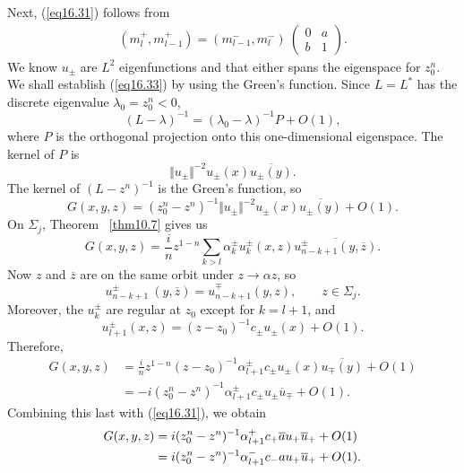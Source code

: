 \documentclass{surv-l}
\theoremstyle{plain}
\theoremstyle{definition}
\numberwithin{equation}{chapter}
\begin{document}
Next, (\ref{eq16.31}) follows from
\begin{align*}
(m_{l}^{+},m_{l-1}^{+})=(m_{l-1}^{-}, m_{l}^{-})\ \left(\begin{array}{ll}
0 & a\\
b & 1
\end{array}\right).
\end{align*}
We know $u_{\pm}$ are $L^{2}$ eigenfunctions and that either spans the eigenspace for $z_{0}^{n}$. We shall establish (\ref{eq16.33}) by using the Green's  function. Since $L=L^{*}$ has the discrete eigenvalue $\lambda_{0}=z_{0}^{n}<0$,
\begin{equation*}
(L-\lambda)^{-1}=(\lambda_{0}-\lambda)^{-1}P+O(1),
\end{equation*}
where $P$ is the orthogonal projection onto this one-dimensional eigenspace. The kernel of $P$ is
\begin{equation*}
\Vert u_{\pm}\Vert^{-2}u_{\pm}(x)\overline{u_{\pm}(y)}.
\end{equation*}
The kernel of $(L-z^{n})^{-1}$ is the Green's function, so
\begin{equation}\label{eq16.34}
G(x, y, z)=(z_{0}^{n}-z^{n})^{-1}\Vert u_{\pm}\Vert^{-2}u_{\pm}(x)\overline{u_{\pm}(y)}+O(1).
\end{equation}
On $\Sigma_{j}$, Theorem ~\ref{thm10.7} gives us
\begin{equation*}
G(x,y, z)=\frac{i}{n}z^{1-n}\sum_{k>l}\alpha_{k}^{\pm}u_{k}^{\pm}(x, z)\overline{u_{n-k+1}^{\pm}(y,\overline{z})}.
\end{equation*}
Now $z$ and $\overline{z}$ are on the same orbit under $z\rightarrow\alpha z$, so
\begin{equation*}
u_{n-k+1}^{\pm}\ (y,\overline{z})=u_{n-k+1}^{\mp}(y,z),\qquad z\in\Sigma_{j}.
\end{equation*}
Moreover, the $u_{k}^{\pm}$ are regular at $z_{0}$ except for $k=l+1$, and
\begin{equation*}
u_{l+1}^{\pm}(x,z)=(z-z_{0})^{-1}c_{\pm} u_{\pm}(x)+O(1).
\end{equation*}
Therefore,
\begin{align*}
G(x,y, z)&=\frac{i}{n}z^{1-n}(z-z_{0})^{-1}\alpha_{l+1}^{\pm}c_{\pm} u_{\pm}(x)\overline{u_{\mp}(y)}+O(1)\\
&=-i(z_{0}^{n}-z^{n})^{-1}\alpha_{l+1}^{\pm}c_{\pm} u_{\pm}\overline{u}_{\mp}+O(1).
\end{align*}
Combining this last with (\ref{eq16.31}), we obtain
\begin{align}\label{eq16.35}
G(x,y, z)&=i(z_{0}^{n}-z^{n})^{-1}\alpha_{l+1}^{+}c_{+}\overline{a}u_{+}\overline{u}_{+}+O(1)\notag\\
&=i(z_{0}^{n}-z^{n})^{-1}\alpha_{l+1}^{-}c_{-}au_{+}\overline{u}_{+}+O(1).
\end{align}
\end{document}

